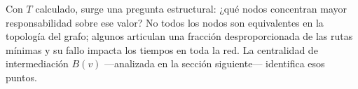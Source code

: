 Con $T$ calculado, surge una pregunta estructural: ¿qué nodos concentran mayor
responsabilidad sobre ese valor? No todos los nodos son equivalentes en la
topología del grafo; algunos articulan una fracción desproporcionada de las
rutas mínimas y su fallo impacta los tiempos en toda la red. La centralidad de
intermediación $B(v)$ —analizada en la sección siguiente— identifica esos
puntos.

